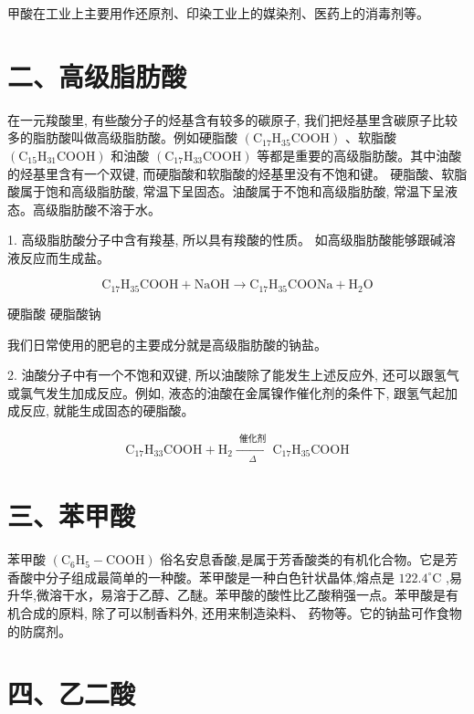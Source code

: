 \documentclass[10pt]{article}
\begin{document}
甲酸在工业上主要用作还原剂、印染工业上的媒染剂、医药上的消毒剂等。

\section*{二、高级脂肪酸}

在一元羧酸里, 有些酸分子的烃基含有较多的碳原子, 我们把烃基里含碳原子比较多的脂肪酸叫做高级脂肪酸。例如硬脂酸 \(\left( {{\mathrm{C}}_{17}{\mathrm{H}}_{35}\mathrm{{COOH}}}\right)\) 、软脂酸 \(\left( {{\mathrm{C}}_{15}{\mathrm{H}}_{31}\mathrm{{COOH}}}\right)\) 和油酸 \(\left( {{\mathrm{C}}_{17}{\mathrm{H}}_{33}\mathrm{{COOH}}}\right)\) 等都是重要的高级脂肪酸。其中油酸的烃基里含有一个双键, 而硬脂酸和软脂酸的烃基里没有不饱和键。 硬脂酸、软脂酸属于饱和高级脂肪酸, 常温下呈固态。油酸属于不饱和高级脂肪酸, 常温下呈液态。高级脂肪酸不溶于水。

1. 高级脂肪酸分子中含有羧基, 所以具有羧酸的性质。 如高级脂肪酸能够跟碱溶液反应而生成盐。

\[
{\mathrm{C}}_{17}{\mathrm{H}}_{35}\mathrm{{COOH}} + \mathrm{{NaOH}} \rightarrow {\mathrm{C}}_{17}{\mathrm{H}}_{35}\mathrm{{COONa}} + {\mathrm{H}}_{2}\mathrm{O}
\]

硬脂酸 硬脂酸钠

我们日常使用的肥皂的主要成分就是高级脂肪酸的钠盐。

2. 油酸分子中有一个不饱和双键, 所以油酸除了能发生上述反应外, 还可以跟氢气或氯气发生加成反应。例如, 液态的油酸在金属镍作催化剂的条件下, 跟氢气起加成反应, 就能生成固态的硬脂酸。

\[
{\mathrm{C}}_{17}{\mathrm{H}}_{33}\mathrm{{COOH}} + {\mathrm{H}}_{2}\xrightarrow[\Delta ]{\text{ 催化剂 }}{\mathrm{C}}_{17}{\mathrm{H}}_{35}\mathrm{{COOH}}
\]

\section*{三、苯甲酸}

苯甲酸 \(\left( {{\mathrm{C}}_{6}{\mathrm{H}}_{5} - \mathrm{{COOH}}}\right)\) 俗名安息香酸,是属于芳香酸类的有机化合物。它是芳香酸中分子组成最简单的一种酸。苯甲酸是一种白色针状晶体,熔点是 \({122.4}^{ \circ }\mathrm{C}\) ,易升华,微溶干水，易溶于乙醇、乙醚。苯甲酸的酸性比乙酸稍强一点。苯甲酸是有机合成的原料, 除了可以制香料外, 还用来制造染料、 药物等。它的钠盐可作食物的防腐剂。

\section*{四、乙二酸}
\end{document}
